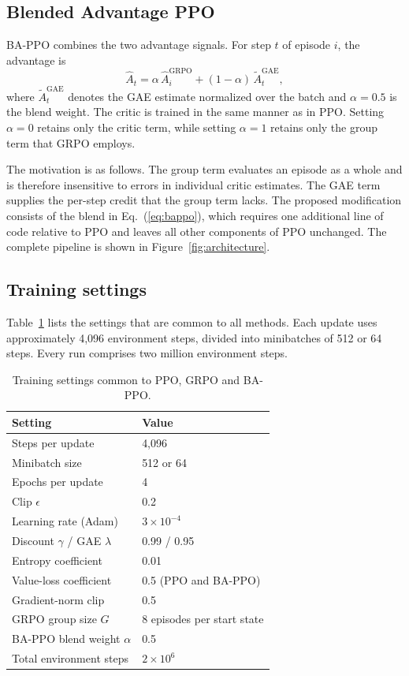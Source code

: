 \documentclass[11pt,a4paper]{article}
\begin{document}
\subsection{Blended Advantage PPO}
\label{sec:bappo}

BA-PPO combines the two advantage signals. For step $t$ of episode $i$, the advantage is
\begin{equation}
\hat{A}_t = \alpha\, \hat{A}^{\text{GRPO}}_i + (1-\alpha)\, \widetilde{A}^{\text{GAE}}_t,
\label{eq:bappo}
\end{equation}
where $\widetilde{A}^{\text{GAE}}_t$ denotes the GAE estimate normalized over the batch and $\alpha = 0.5$ is the blend weight. The critic is trained in the same manner as in PPO. Setting $\alpha = 0$ retains only the critic term, while setting $\alpha = 1$ retains only the group term that GRPO employs.

The motivation is as follows. The group term evaluates an episode as a whole and is therefore insensitive to errors in individual critic estimates. The GAE term supplies the per-step credit that the group term lacks. The proposed modification consists of the blend in Eq.~(\ref{eq:bappo}), which requires one additional line of code relative to PPO and leaves all other components of PPO unchanged. The complete pipeline is shown in Figure~\ref{fig:architecture}.

\subsection{Training settings}
\label{sec:settings}

Table~\ref{tab:settings} lists the settings that are common to all methods. Each update uses approximately 4,096 environment steps, divided into minibatches of 512 or 64 steps. Every run comprises two million environment steps.

\begin{table}[t]
\centering
\caption{Training settings common to PPO, GRPO and BA-PPO.}
\label{tab:settings}
\begin{tabular}{@{}ll@{}}
\toprule
Setting & Value \\
\midrule
Steps per update & 4,096 \\
Minibatch size & 512 or 64 \\
Epochs per update & 4 \\
Clip $\epsilon$ & 0.2 \\
Learning rate (Adam) & $3\times10^{-4}$ \\
Discount $\gamma$ / GAE $\lambda$ & 0.99 / 0.95 \\
Entropy coefficient & 0.01 \\
Value-loss coefficient & 0.5 (PPO and BA-PPO) \\
Gradient-norm clip & 0.5 \\
GRPO group size $G$ & 8 episodes per start state \\
BA-PPO blend weight $\alpha$ & 0.5 \\
Total environment steps & $2\times10^{6}$ \\
\bottomrule
\end{tabular}
\end{table}
\end{document}
